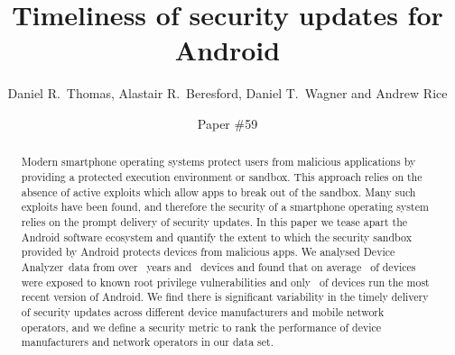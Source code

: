 \documentclass[conference,a4paper,twoside]{IEEEtran}
\author{Daniel R.\ Thomas, Alastair R.\ Beresford, Daniel T.\ Wagner and Andrew Rice}
\newcommand{\da}{Device Analyzer}
\newcommand{\blindauthors}[1]{Paper \#59}%
\begin{document}
\title{Timeliness of security updates for Android}


\author{
\blindauthors{
\IEEEauthorblockN{Daniel R. Thomas,
Daniel T. Wagner,
Alastair R. Beresford,
Andrew Rice}
\IEEEauthorblockA{
Computer Laboratory\\
University of Cambridge\\
Cambridge, United Kingdom\\
Firstname.Lastname@cl.cam.ac.uk
}
}
}




\maketitle


\begin{abstract}
Modern smartphone operating systems protect users from malicious applications by providing a protected execution environment or sandbox.
This approach relies on the absence of active exploits which allow apps to break out of the sandbox.
Many such exploits have been found, and therefore the security of a smartphone operating system relies on the prompt delivery of security updates.
In this paper we tease apart the Android software ecosystem and quantify the extent to which the security sandbox provided by Android protects devices from malicious apps.
We analysed \da\ data from over \daOSYearsOfData\ years and \daNumOSDevices\ devices and found that on average \daMeanInsecurityPercNominal\ of devices were exposed to known root privilege vulnerabilities and only \daUpdatednessPercNominal\ of devices run the most recent version of Android.
We find there is significant variability in the timely delivery of security updates across different device manufacturers and mobile network operators, and we define a security metric to rank the performance of device manufacturers and network operators in our data set.
\end{abstract}
\end{document}
